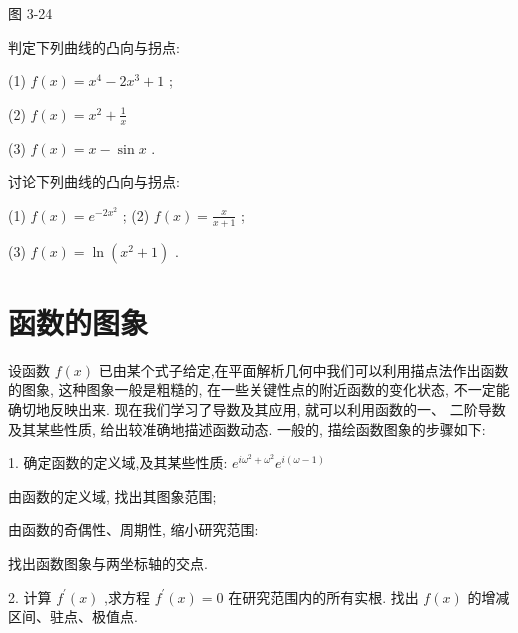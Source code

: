 \documentclass[lang=cn,newtx,10pt,scheme=chinese]{elegantbook}
\begin{document}
图 3-24

\begin{center}
\end{center}

\begin{problemset}[练习]

\item 判定下列曲线的凸向与拐点:

(1) \(f\left( x\right) = {x}^{4} - 2{x}^{3} + 1\) ;

(2) \(f\left( x\right) = {x}^{2} + \frac{1}{x}\)

(3) \(f\left( x\right) = x - \sin x\) .

\item 讨论下列曲线的凸向与拐点:

(1) \(f\left( x\right) = {e}^{-2{x}^{2}}\) ; (2) \(f\left( x\right) = \frac{x}{x + 1}\) ;

(3) \(f\left( x\right) = \ln \left( {{x}^{2} + 1}\right)\) .

\end{problemset}

\section{函数的图象}

设函数 \(f\left( x\right)\) 已由某个式子给定,在平面解析几何中我们可以利用描点法作出函数的图象, 这种图象一般是粗糙的, 在一些关键性点的附近函数的变化状态, 不一定能确切地反映出来. 现在我们学习了导数及其应用, 就可以利用函数的一、 二阶导数及其某些性质, 给出较准确地描述函数动态. 一般的, 描绘函数图象的步骤如下:

1. 确定函数的定义域,及其某些性质: \({e}^{i{\omega }^{2} + {\omega }^{2}}{e}^{i\left( {\omega - 1}\right) }\)

由函数的定义域, 找出其图象范围;

由函数的奇偶性、周期性, 缩小研究范围:

找出函数图象与两坐标轴的交点.

2. 计算 \({f}^{\prime }\left( x\right)\) ,求方程 \({f}^{\prime }\left( x\right) = 0\) 在研究范围内的所有实根. 找出 \(f\left( x\right)\) 的增减区间、驻点、极值点.
\end{document}
